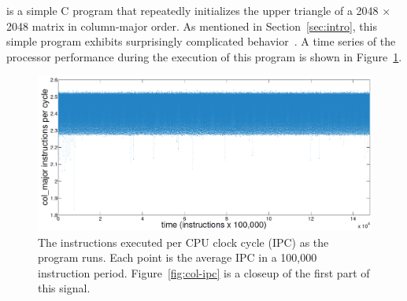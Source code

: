 


\col is a simple C program that repeatedly initializes the upper
triangle of a 2048 $\times$ 2048 matrix in column-major order.
% 
% 
%   
%
As mentioned in Section~\ref{sec:intro}, this simple program exhibits
surprisingly complicated behavior~\cite{mytkowicz09}.  A time series
of the processor performance during the execution of this program is
shown in Figure~\ref{fig:col-ts}.
\begin{figure}[htbp]
  \centering
    \includegraphics[width=\columnwidth]{figs/colFullTS}
    \caption{The instructions executed per CPU clock cycle (IPC) as
      the \col program runs.  Each point is the average IPC in a
      100,000 instruction period. Figure~\ref{fig:col-ipc} is a
      closeup of the first part of this signal.  }
    \label{fig:col-ts}
  
  \end{figure}


